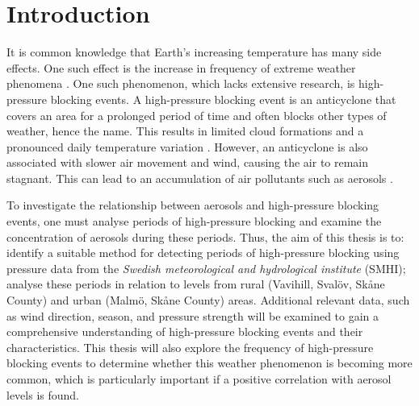 \section{Introduction}
It is common knowledge that Earth's increasing temperature has many side effects. One such effect is the increase in frequency of extreme weather phenomena \cite{mitchellExtremeEventsDue2006}. One such phenomenon, which lacks extensive research, is high-pressure blocking events. A high-pressure blocking event is an anticyclone that covers an area for a prolonged period of time and often blocks other types of weather, hence the name. This results in limited cloud formations and a pronounced daily temperature variation \cite{lupoAtmosphericBlockingEvents2020}. However, an anticyclone is also associated with slower air movement and wind, causing the air to remain stagnant. This can lead to an accumulation of air pollutants such as aerosols \cite{caiImpactBlockingStructure2020}.

To investigate the relationship between aerosols and high-pressure blocking events, one must analyse periods of high-pressure blocking and examine the concentration of aerosols during these periods. Thus, the aim of this thesis is to: identify a suitable method for detecting periods of high-pressure blocking using pressure data from the \textit{Swedish meteorological and hydrological institute} (SMHI); analyse these periods in relation to \PM levels from rural (Vavihill, Svalöv, Skåne County) and urban (Malmö, Skåne County) areas. Additional relevant data, such as wind direction, season, and pressure strength will be examined to gain a comprehensive understanding of high-pressure blocking events and their characteristics. This thesis will also explore the frequency of high-pressure blocking events to determine whether this weather phenomenon is becoming more common, which is particularly important if a positive correlation with aerosol levels is found. 
